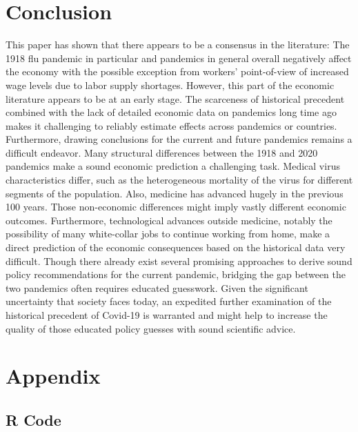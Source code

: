 \documentclass[12pt,a4paper]{article}
\begin{document}
\section{Conclusion}

This paper has shown that there appears to be a consensus in the literature: The 1918 flu pandemic in particular and pandemics in general overall negatively affect the economy with the possible exception from workers' point-of-view of increased wage levels due to labor supply shortages.
However, this part of the economic literature appears to be at an early stage.
The scarceness of historical precedent combined with the lack of detailed economic data on pandemics long time ago makes it challenging to reliably estimate effects across pandemics or countries.
Furthermore, drawing conclusions for the current and future pandemics remains a difficult endeavor.
Many structural differences between the 1918 and 2020 pandemics make a sound economic prediction a challenging task.
Medical virus characteristics differ, such as the heterogeneous mortality of the virus for different segments of the population.
Also, medicine has advanced hugely in the previous 100 years.
Those non-economic differences might imply vastly different economic outcomes.
Furthermore, technological advances outside medicine, notably the possibility of many white-collar jobs to continue working from home, make a direct prediction of the economic consequences based on the historical data very difficult.
Though there already exist several promising approaches to derive sound policy recommendations for the current pandemic, bridging the gap between the two pandemics often requires educated guesswork.
Given the significant uncertainty that society faces today, an expedited further examination of the historical precedent of Covid-19 is warranted and might help to increase the quality of those educated policy guesses with sound scientific advice.


\clearpage
\appendix
\section{Appendix}
\subsection{R Code}
\end{document}

